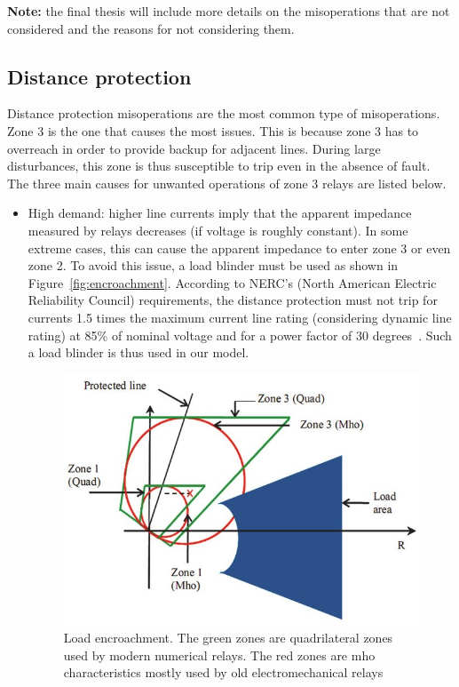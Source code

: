 \textbf{Note:} the final thesis will include more details on the misoperations that are not considered and the reasons for not considering them.

\subsection{Distance protection}

Distance protection misoperations are the most common type of misoperations. Zone 3 is the one that causes the most issues. This is because zone 3 has to overreach in order to provide backup for adjacent lines. During large disturbances, this zone is thus susceptible to trip even in the absence of fault. The three main causes for unwanted operations of zone 3 relays are listed below.

\begin{itemize}
    \item High demand: higher line currents imply that the apparent impedance measured by relays decreases (if voltage is roughly constant). In some extreme cases, this can cause the apparent impedance to enter zone 3 or even zone 2. To avoid this issue, a load blinder must be used as shown in Figure~\ref{fig:encroachment}. According to NERC's (North American Electric Reliability Council) requirements, the distance protection must not trip for currents 1.5 times the maximum current line rating (considering dynamic line rating) at 85\% of nominal voltage and for a power factor of 30 degrees~\cite{PSRCreportProtectionMisop}. Such a load blinder is thus used in our model.
\begin{figure}
    \centering
    \includegraphics[width=0.8\linewidth]{Figs/LoadEncroachment.jpg}
    \caption{Load encroachment. The green zones are quadrilateral zones used by modern numerical relays. The red zones are mho characteristics mostly used by old electromechanical relays~\cite{LoadEncroachmentFig}}

\end{figure}
\end{itemize}
